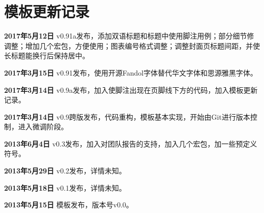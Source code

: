 \chapter{模板更新记录}
\label{chap:updatelog}
\textbf{2017年5月12日} v0.91a发布，添加双语标题和标题中使用脚注用例；部分细节修调整；增加几个宏包，方便使用；图表编号格式调整；调整封面页标题间距，并使长标题能换行后保持居中。

\textbf{2017年3月15日} v0.91发布，使用开源Fandol字体替代华文字体和思源雅黑字体。

\textbf{2017年3月14日} v0.9a发布，加入使脚注出现在页脚线下方的代码，加入模板更新记录。

\textbf{2017年3月14日} v0.9跨版发布，代码重构，模板基本实现，开始由Git进行版本控制，进入微调阶段。

\textbf{2013年6月4日} v0.3发布，加入对团队报告的支持，加入几个宏包，加一些预定义符号。

\textbf{2013年5月29日} v0.2发布，详情未知。

\textbf{2013年5月18日} v0.1发布，详情未知。

\textbf{2013年5月15日} 模板发布，版本号v0.0。
